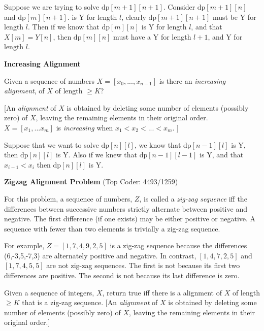 Suppose we are trying to solve $\text{dp}[m+1][n+1]$. 
Consider $\text{dp}[m+1][n]$ and $\text{dp}[m][n+1]$. is Y for length $l$, clearly 
$\text{dp}[m+1][n+1]$ must be Y for length $l$. Then if we know that $\text{dp}[m][n]$ is Y for 
length $l$, and that $X[m] = Y[n]$, then $\text{dp}[m][n]$ must have a Y for length $l+1$, 
and Y for length $l$. 

\frmrule

\textbf{Increasing Alignment} 

Given a sequence of numbers $X = [x_0, ... ,x_{n-1}]$ 
is there an \textit{increasing alignment}, of $X$ of length $\geqslant K$? 

[An \textit{alignment} of $X$ is obtained by deleting some number of elements (possibly zero) of $X$, 
leaving the remaining elements in their original order. 
$X = [x_1, ... x_m]$ is \textit{increasing} when $x_1 < x_2 < ... < x_m$. ]

\frmrule

Suppose that we want to solve $\text{dp}[n][l]$, we know that 
$\text{dp}[n-1][l]$ is Y, then $\text{dp}[n][l]$ is Y. 
Also if we knew that $\text{dp}[n-1][l-1]$ is Y, and 
that $x_{i-1} < x_i$ then $\text{dp}[n][l]$ is Y. 

\frmrule


\textbf{Zigzag Alignment Problem} (Top Coder: 4493/1259)

For this problem, a sequence of numbers, $Z$, is called a \textit{zig-zag sequence} 
iff the differences between successive numbers strictly alternate between positive and negative. 
The first difference (if one exists) may be either positive or negative. 
A sequence with fewer than two elements is trivially a zig-zag sequence.

For example, $Z = [1,7,4,9,2,5]$ is a zig-zag sequence because the differences (6,-3,5,-7,3) are alternately positive and negative. In contrast, $[1,4,7,2,5]$ and $[1,7,4,5,5]$ are not zig-zag sequences. 
The first is not because its first two differences are positive. 
The second is not because its last difference is zero.

Given a sequence of integers, $X$, return true iff there is a alignment of $X$ of length $\geqslant K$
that is a zig-zag sequence.  
[An \textit{alignment} of $X$ is obtained by deleting some number of elements (possibly zero) of $X$, 
leaving the remaining elements in their original order.]

\frmrule


